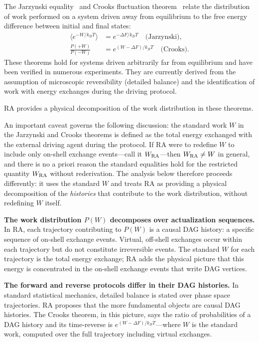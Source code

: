 \documentclass[11pt,a4paper]{article}
\theoremstyle{plain}
\theoremstyle{definition}
\theoremstyle{remark}
\begin{document}
The Jarzynski equality~\citep{Jarzynski1997} and Crooks fluctuation
theorem~\citep{Crooks1999} relate the distribution of work performed on a system
driven away from equilibrium to the free energy difference between initial and
final states:
\begin{align}
  \langle e^{-W/k_BT} \rangle &= e^{-\Delta F/k_BT} \quad \text{(Jarzynski)}, \\
  \frac{P(+W)}{P(-W)} &= e^{(W - \Delta F)/k_BT} \quad \text{(Crooks)}.
\end{align}
These theorems hold for systems driven arbitrarily far from equilibrium and have
been verified in numerous experiments. They are currently derived from the
assumption of microscopic reversibility (detailed balance) and the identification
of work with energy exchanges during the driving protocol.

RA provides a physical decomposition of the work distribution in these theorems.

An important caveat governs the following discussion: the standard work $W$ in the
Jarzynski and Crooks theorems is defined as the total energy exchanged with the
external driving agent during the protocol. If RA were to redefine $W$ to include
only on-shell exchange events---call it $W_{\rm RA}$---then $W_{\rm RA} \neq W$
in general, and there is no a priori reason the standard equalities hold for the
restricted quantity $W_{\rm RA}$ without rederivation. The analysis below therefore
proceeds differently: it uses the standard $W$ and treats RA as providing a
physical decomposition of the \emph{histories} that contribute to the work
distribution, without redefining $W$ itself.

\textbf{The work distribution $P(W)$ decomposes over actualization sequences.}
In RA, each trajectory contributing to $P(W)$ is a causal DAG history: a specific
sequence of on-shell exchange events. Virtual, off-shell exchanges occur within
each trajectory but do not constitute irreversible events. The standard $W$ for
each trajectory is the total energy exchange; RA adds the physical picture that
this energy is concentrated in the on-shell exchange events that write DAG vertices.

\textbf{The forward and reverse protocols differ in their DAG histories.}
In standard statistical mechanics, detailed balance is stated over phase space
trajectories. RA proposes that the more fundamental objects are causal DAG
histories. The Crooks theorem, in this picture, says the ratio of probabilities
of a DAG history and its time-reverse is $e^{(W-\Delta F)/k_BT}$---where $W$ is
the standard work, computed over the full trajectory including virtual exchanges.
\end{document}
